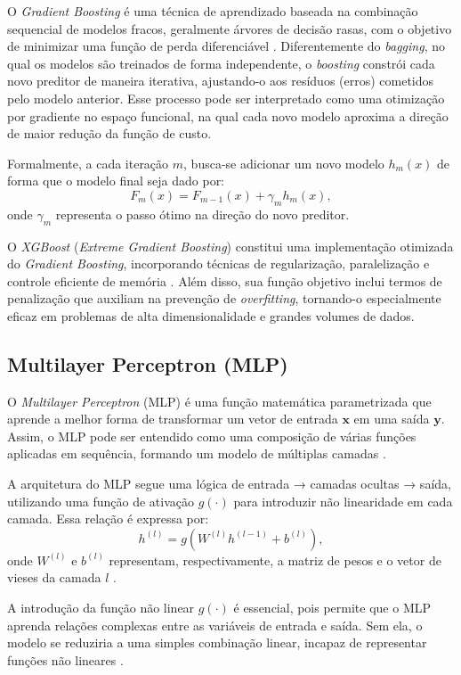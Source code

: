 O \textit{Gradient Boosting} é uma técnica de aprendizado baseada na combinação sequencial de modelos fracos, geralmente árvores de decisão rasas, 
com o objetivo de minimizar uma função de perda diferenciável \cite{Geron2019}. Diferentemente do \textit{bagging}, no qual os modelos são treinados 
de forma independente, o \textit{boosting} constrói cada novo preditor de maneira iterativa, ajustando-o aos resíduos (erros) cometidos pelo modelo anterior. 
Esse processo pode ser interpretado como uma otimização por gradiente no espaço funcional, na qual cada novo modelo 
aproxima a direção de maior redução da função de custo.

Formalmente, a cada iteração \( m \), busca-se adicionar um novo modelo \( h_m(x) \) de forma que o modelo final seja dado por:
\[
F_m(x) = F_{m-1}(x) + \gamma_m h_m(x),
\]
onde \( \gamma_m \) representa o passo ótimo na direção do novo preditor.

O \textit{XGBoost} (\textit{Extreme Gradient Boosting}) constitui uma implementação otimizada do \textit{Gradient Boosting}, 
incorporando técnicas de regularização, paralelização e controle eficiente de memória \cite{Geron2019}. 
Além disso, sua função objetivo inclui termos de penalização que auxiliam na prevenção de \textit{overfitting}, 
tornando-o especialmente eficaz em problemas de alta dimensionalidade e grandes volumes de dados.

\subsection{Multilayer Perceptron (MLP)}

O \textit{Multilayer Perceptron} (MLP) é uma função matemática parametrizada que aprende a melhor forma de transformar um vetor de 
entrada \( \mathbf{x} \) em uma saída \( \mathbf{y} \). Assim, o MLP pode ser entendido como uma composição de várias funções aplicadas em sequência, 
formando um modelo de múltiplas camadas \cite{Goodfellow2016}.

A arquitetura do MLP segue uma lógica de entrada → camadas ocultas → saída, utilizando uma função de ativação \( g(\cdot) \) para 
introduzir não linearidade em cada camada. Essa relação é expressa por:
\[
h^{(l)} = g\!\left(W^{(l)}h^{(l-1)} + b^{(l)}\right),
\]
onde \( W^{(l)} \) e \( b^{(l)} \) representam, respectivamente, a matriz de pesos e o vetor de vieses da camada \( l \) \cite{Goodfellow2016}.

A introdução da função não linear \( g(\cdot) \) é essencial, pois permite que o MLP aprenda relações complexas entre as variáveis de entrada e saída. 
Sem ela, o modelo se reduziria a uma simples combinação linear, incapaz de representar funções não lineares \cite{Goodfellow2016}.

